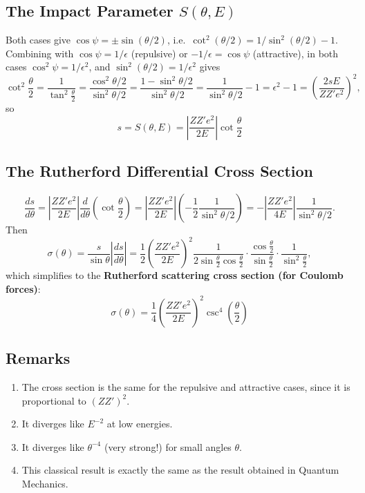 \documentclass[11pt]{article}
\begin{document}
\subsection{The Impact Parameter $S(\theta,E)$}

Both cases give $\cos\psi = \pm\sin(\theta/2)$, i.e.\ $\cot^2(\theta/2) = 1/\sin^2(\theta/2) - 1$.
Combining with $\cos\psi = 1/\epsilon$ (repulsive) or $-1/\epsilon = \cos\psi$ (attractive), in both
cases $\cos^2\psi = 1/\epsilon^2$, and $\sin^2(\theta/2) = 1/\epsilon^2$ gives
\[
\cot^2\frac{\theta}{2} = \frac{1}{\tan^2\frac\theta2} = \frac{\cos^2\theta/2}{\sin^2\theta/2}
= \frac{1-\sin^2\theta/2}{\sin^2\theta/2} = \frac{1}{\sin^2\theta/2}-1 = \epsilon^2-1 = \left(\frac{2sE}{ZZ'e^2}\right)^2,
\]
so
\begin{equation}
\boxed{s = S(\theta,E) = \left|\frac{ZZ'e^2}{2E}\right|\cot\frac{\theta}{2}}
\end{equation}

\subsection{The Rutherford Differential Cross Section}

\[
\frac{ds}{d\theta} = \left|\frac{ZZ'e^2}{2E}\right|\frac{d}{d\theta}\left(\cot\frac\theta2\right)
= \left|\frac{ZZ'e^2}{2E}\right|\left(-\frac{1}{2}\frac{1}{\sin^2\theta/2}\right)
= -\left|\frac{ZZ'e^2}{4E}\right|\frac{1}{\sin^2\theta/2}.
\]
Then
\[
\sigma(\theta) = \frac{s}{\sin\theta}\left|\frac{ds}{d\theta}\right|
= \frac12\left(\frac{ZZ'e^2}{2E}\right)^2 \frac{1}{2\sin\frac\theta2\cos\frac\theta2}\cdot\frac{\cos\frac\theta2}{\sin\frac\theta2}\cdot\frac{1}{\sin^2\frac\theta2},
\]
which simplifies to the \textbf{Rutherford scattering cross section (for Coulomb forces)}:
\begin{equation}
\boxed{\sigma(\theta) = \frac14\left(\frac{ZZ'e^2}{2E}\right)^2 \csc^4\left(\frac\theta2\right)}
\end{equation}

\subsection{Remarks}
\begin{enumerate}
\item The cross section is the same for the repulsive and attractive cases, since it is
proportional to $(ZZ')^2$.
\item It diverges like $E^{-2}$ at low energies.
\item It diverges like $\theta^{-4}$ (very strong!) for small angles $\theta$.
\item This classical result is exactly the same as the result obtained in Quantum Mechanics.
\end{enumerate}
\end{document}
